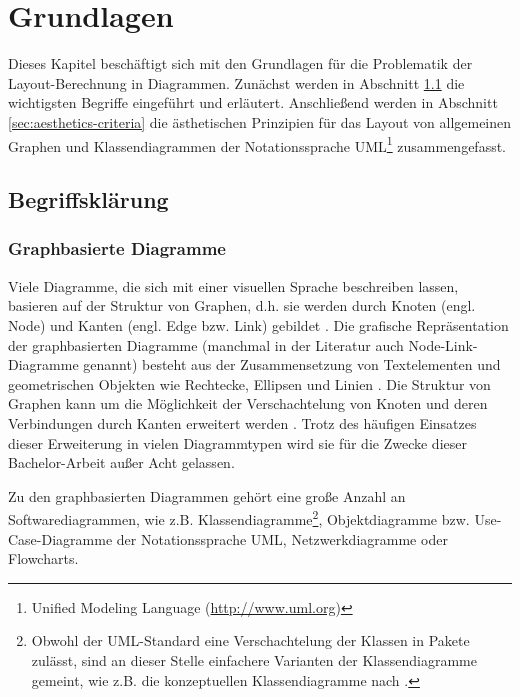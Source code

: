
\chapter{Grundlagen}
\label{chapter:basics}

Dieses Kapitel beschäftigt sich mit den Grundlagen für die Problematik der Layout-Be\-rech\-nung in Diagrammen. Zunächst werden in Abschnitt \ref{sec:disambiguation} die wichtigsten Begriffe eingeführt und erläutert. Anschließend werden in Abschnitt \ref{sec:aesthetics-criteria} die ästhetischen Prinzipien für das Layout von allgemeinen Graphen und Klassendiagrammen der Notationssprache UML\footnote{Unified Modeling Language (\url{http://www.uml.org})} zusammengefasst.

\section{Begriffsklärung}
\label{sec:disambiguation}

\subsection{Graphbasierte Diagramme}
\label{subsec:graph-based-diagrams}

Viele Diagramme, die sich mit einer visuellen Sprache beschreiben lassen, basieren auf der Struktur von Graphen, d.h. sie werden durch Knoten (engl. Node) und Kanten (engl. Edge bzw. Link) gebildet \cite{Eichelberger05Aesthetics}. Die grafische Repräsentation der graphbasierten Diagramme (manchmal in der Literatur auch Node-Link-Diagramme genannt) besteht aus der Zusammensetzung von Textelementen und geometrischen Objekten wie Rechtecke, Ellipsen und Linien \cite{Wybrow08Using}. Die Struktur von Graphen kann um die Möglichkeit der Verschachtelung von Knoten und deren Verbindungen durch Kanten erweitert werden \cite{Siebenhaller03Automatisches, Wybrow08Using}. Trotz des häufigen Einsatzes dieser Erweiterung in vielen Diagrammtypen wird sie für die Zwecke dieser Bachelor-Arbeit außer Acht gelassen.

Zu den graphbasierten Diagrammen gehört eine große Anzahl an Softwarediagrammen, wie z.B. Klassendiagramme\footnote{Obwohl der UML-Standard eine Verschachtelung der Klassen in Pakete zulässt, sind an dieser Stelle einfachere Varianten der Klassendiagramme gemeint, wie z.B. die konzeptuellen Klassendiagramme nach \cite{Ambler04UML-2-Class}.}, Objektdiagramme bzw. Use-Case-Diagramme der Notationssprache UML, Netzwerkdiagramme oder Flowcharts.

